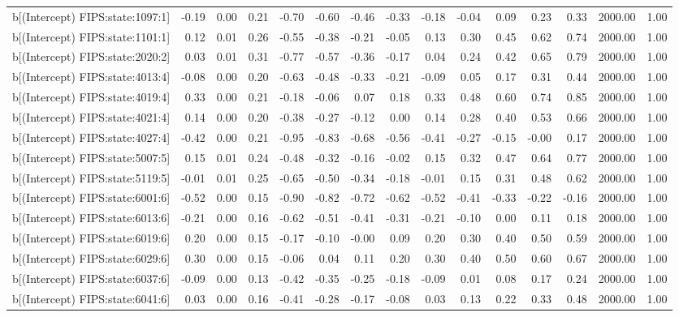 \begin{table}[ht]
\begin{tabular}{rrrrrrrrrrrrrrr}
  b[(Intercept) FIPS:state:1097:1] & -0.19 & 0.00 & 0.21 & -0.70 & -0.60 & -0.46 & -0.33 & -0.18 & -0.04 & 0.09 & 0.23 & 0.33 & 2000.00 & 1.00 \\ 
  b[(Intercept) FIPS:state:1101:1] & 0.12 & 0.01 & 0.26 & -0.55 & -0.38 & -0.21 & -0.05 & 0.13 & 0.30 & 0.45 & 0.62 & 0.74 & 2000.00 & 1.00 \\ 
  b[(Intercept) FIPS:state:2020:2] & 0.03 & 0.01 & 0.31 & -0.77 & -0.57 & -0.36 & -0.17 & 0.04 & 0.24 & 0.42 & 0.65 & 0.79 & 2000.00 & 1.00 \\ 
  b[(Intercept) FIPS:state:4013:4] & -0.08 & 0.00 & 0.20 & -0.63 & -0.48 & -0.33 & -0.21 & -0.09 & 0.05 & 0.17 & 0.31 & 0.44 & 2000.00 & 1.00 \\ 
  b[(Intercept) FIPS:state:4019:4] & 0.33 & 0.00 & 0.21 & -0.18 & -0.06 & 0.07 & 0.18 & 0.33 & 0.48 & 0.60 & 0.74 & 0.85 & 2000.00 & 1.00 \\ 
  b[(Intercept) FIPS:state:4021:4] & 0.14 & 0.00 & 0.20 & -0.38 & -0.27 & -0.12 & 0.00 & 0.14 & 0.28 & 0.40 & 0.53 & 0.66 & 2000.00 & 1.00 \\ 
  b[(Intercept) FIPS:state:4027:4] & -0.42 & 0.00 & 0.21 & -0.95 & -0.83 & -0.68 & -0.56 & -0.41 & -0.27 & -0.15 & -0.00 & 0.17 & 2000.00 & 1.00 \\ 
  b[(Intercept) FIPS:state:5007:5] & 0.15 & 0.01 & 0.24 & -0.48 & -0.32 & -0.16 & -0.02 & 0.15 & 0.32 & 0.47 & 0.64 & 0.77 & 2000.00 & 1.00 \\ 
  b[(Intercept) FIPS:state:5119:5] & -0.01 & 0.01 & 0.25 & -0.65 & -0.50 & -0.34 & -0.18 & -0.01 & 0.15 & 0.31 & 0.48 & 0.62 & 2000.00 & 1.00 \\ 
  b[(Intercept) FIPS:state:6001:6] & -0.52 & 0.00 & 0.15 & -0.90 & -0.82 & -0.72 & -0.62 & -0.52 & -0.41 & -0.33 & -0.22 & -0.16 & 2000.00 & 1.00 \\ 
  b[(Intercept) FIPS:state:6013:6] & -0.21 & 0.00 & 0.16 & -0.62 & -0.51 & -0.41 & -0.31 & -0.21 & -0.10 & 0.00 & 0.11 & 0.18 & 2000.00 & 1.00 \\ 
  b[(Intercept) FIPS:state:6019:6] & 0.20 & 0.00 & 0.15 & -0.17 & -0.10 & -0.00 & 0.09 & 0.20 & 0.30 & 0.40 & 0.50 & 0.59 & 2000.00 & 1.00 \\ 
  b[(Intercept) FIPS:state:6029:6] & 0.30 & 0.00 & 0.15 & -0.06 & 0.04 & 0.11 & 0.20 & 0.30 & 0.40 & 0.50 & 0.60 & 0.67 & 2000.00 & 1.00 \\ 
  b[(Intercept) FIPS:state:6037:6] & -0.09 & 0.00 & 0.13 & -0.42 & -0.35 & -0.25 & -0.18 & -0.09 & 0.01 & 0.08 & 0.17 & 0.24 & 2000.00 & 1.00 \\ 
  b[(Intercept) FIPS:state:6041:6] & 0.03 & 0.00 & 0.16 & -0.41 & -0.28 & -0.17 & -0.08 & 0.03 & 0.13 & 0.22 & 0.33 & 0.48 & 2000.00 & 1.00 \\ 

\end{tabular}
\end{table}
